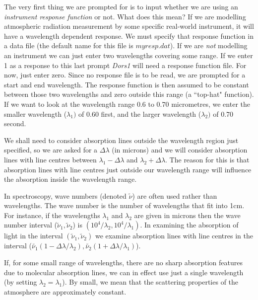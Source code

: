 \documentclass[12pt]{article}
\begin{document}
The very first thing we are prompted for is to input whether we are using an {\it instrument response function} or not.
What does this mean?  If we are modelling atmospheric radiation measurement by some specific real-world 
instrument,  it will have  a wavelength dependent response. We must specify that response function in a data file
 (the default name for this file is $myresp.dat$). If we are {\it not} modelling an instrument
 we can just enter two wavelengths covering some range. If we enter 1 as a response to this last prompt {\it Dors1} will
need a response function file. For now, just enter zero. Since no response file is to be read, 
we are prompted for a start and end wavelength. The response function is then assumed to be constant between those two 
wavelengths and zero outside this range (a ``top-hat" function). If we want to look at the wavelength
range 0.6 to 0.70 micrometres, we enter the smaller wavelength ($\lambda_1)$ of 0.60 first, and the larger
wavelength ($\lambda_2)$ of 0.70 second. 

We shall need to consider absorption lines outside the wavelength region just specified, so we are asked for a 
$\Delta \lambda$ (in microns) and we will consider absorption lines with line centres between
  $\lambda_1-\Delta \lambda$ and 
$\lambda_2+\Delta \lambda$. The reason for this is that absorption lines with line centres
 just outside our wavelength range will influence the absorption inside the wavelength range. 

In spectroscopy, wave numbers (denoted $\tilde{\nu}$) are often used rather than wavelengths. The wave number
is the number of wavelengths that fit into 1cm. For instance, if the wavelengths $\lambda_1$ and $\lambda_2$
 are given in microns then the wave number interval ($\tilde{\nu}_1 ,\tilde{\nu}_2$) is $(10^4/\lambda_2, 10^4/\lambda_1)$. In examining the  absorption of light in the interval
 $(\tilde{\nu}_1, \tilde{\nu}_2)$
 we examine absorption lines with line centres in the interval ($\tilde{\nu_1}(1-\Delta \lambda/\lambda_2),
 \tilde{\nu_2}(1+\Delta \lambda/\lambda_1)$).

If, for some small range of wavelengths, there are no sharp absorption  features due
 to molecular absorption lines, we can in effect use just a single wavelength (by setting $\lambda_2=\lambda_1$).
By small, we mean that the scattering properties of the atmosphere are approximately constant. 
\end{document}
